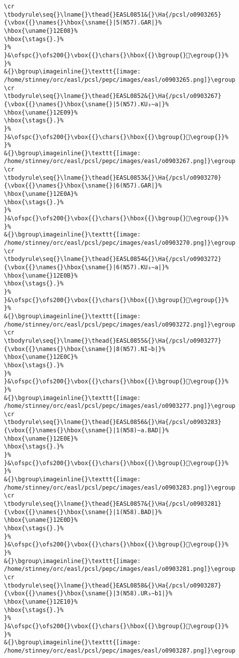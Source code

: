 \begin{verbatim}
\cr
\tbodyrule\seq{}\lname{}\thead{}EASL0851&{}\Ha{/pcsl/o0903265}{\vbox{{}\names{}\hbox{\sname{}|5(N57).GAR|}%
\hbox{\uname{}12E08}%
\hbox{\stags{}.}%
}%
}&\ofspc{}\ofs200{}\vbox{{}\chars{}\hbox{{}\bgroup{}𒸈\egroup{}}%
}%
&{}\bgroup\imageinline{}\texttt{[image: /home/stinney/orc/easl/pcsl/pepc/images/easl/o0903265.png]}\egroup
\cr
\tbodyrule\seq{}\lname{}\thead{}EASL0852&{}\Ha{/pcsl/o0903267}{\vbox{{}\names{}\hbox{\sname{}|5(N57).KU₃∼a|}%
\hbox{\uname{}12E09}%
\hbox{\stags{}.}%
}%
}&\ofspc{}\ofs200{}\vbox{{}\chars{}\hbox{{}\bgroup{}𒸉\egroup{}}%
}%
&{}\bgroup\imageinline{}\texttt{[image: /home/stinney/orc/easl/pcsl/pepc/images/easl/o0903267.png]}\egroup
\cr
\tbodyrule\seq{}\lname{}\thead{}EASL0853&{}\Ha{/pcsl/o0903270}{\vbox{{}\names{}\hbox{\sname{}|6(N57).GAR|}%
\hbox{\uname{}12E0A}%
\hbox{\stags{}.}%
}%
}&\ofspc{}\ofs200{}\vbox{{}\chars{}\hbox{{}\bgroup{}𒸊\egroup{}}%
}%
&{}\bgroup\imageinline{}\texttt{[image: /home/stinney/orc/easl/pcsl/pepc/images/easl/o0903270.png]}\egroup
\cr
\tbodyrule\seq{}\lname{}\thead{}EASL0854&{}\Ha{/pcsl/o0903272}{\vbox{{}\names{}\hbox{\sname{}|6(N57).KU₃∼a|}%
\hbox{\uname{}12E0B}%
\hbox{\stags{}.}%
}%
}&\ofspc{}\ofs200{}\vbox{{}\chars{}\hbox{{}\bgroup{}𒸋\egroup{}}%
}%
&{}\bgroup\imageinline{}\texttt{[image: /home/stinney/orc/easl/pcsl/pepc/images/easl/o0903272.png]}\egroup
\cr
\tbodyrule\seq{}\lname{}\thead{}EASL0855&{}\Ha{/pcsl/o0903277}{\vbox{{}\names{}\hbox{\sname{}|8(N57).NI∼b|}%
\hbox{\uname{}12E0C}%
\hbox{\stags{}.}%
}%
}&\ofspc{}\ofs200{}\vbox{{}\chars{}\hbox{{}\bgroup{}𒸌\egroup{}}%
}%
&{}\bgroup\imageinline{}\texttt{[image: /home/stinney/orc/easl/pcsl/pepc/images/easl/o0903277.png]}\egroup
\cr
\tbodyrule\seq{}\lname{}\thead{}EASL0856&{}\Ha{/pcsl/o0903283}{\vbox{{}\names{}\hbox{\sname{}|1(N58)∼a.BAD|}%
\hbox{\uname{}12E0E}%
\hbox{\stags{}.}%
}%
}&\ofspc{}\ofs200{}\vbox{{}\chars{}\hbox{{}\bgroup{}𒸎\egroup{}}%
}%
&{}\bgroup\imageinline{}\texttt{[image: /home/stinney/orc/easl/pcsl/pepc/images/easl/o0903283.png]}\egroup
\cr
\tbodyrule\seq{}\lname{}\thead{}EASL0857&{}\Ha{/pcsl/o0903281}{\vbox{{}\names{}\hbox{\sname{}|1(N58).BAD|}%
\hbox{\uname{}12E0D}%
\hbox{\stags{}.}%
}%
}&\ofspc{}\ofs200{}\vbox{{}\chars{}\hbox{{}\bgroup{}𒸍\egroup{}}%
}%
&{}\bgroup\imageinline{}\texttt{[image: /home/stinney/orc/easl/pcsl/pepc/images/easl/o0903281.png]}\egroup
\cr
\tbodyrule\seq{}\lname{}\thead{}EASL0858&{}\Ha{/pcsl/o0903287}{\vbox{{}\names{}\hbox{\sname{}|3(N58).UR₃∼b1|}%
\hbox{\uname{}12E10}%
\hbox{\stags{}.}%
}%
}&\ofspc{}\ofs200{}\vbox{{}\chars{}\hbox{{}\bgroup{}𒸐\egroup{}}%
}%
&{}\bgroup\imageinline{}\texttt{[image: /home/stinney/orc/easl/pcsl/pepc/images/easl/o0903287.png]}\egroup

\end{verbatim}

